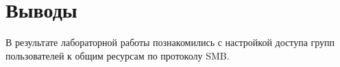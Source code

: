 \section{Выводы}
В результате лабораторной работы познакомились с настройкой доступа групп пользователей к общим ресурсам по протоколу SMB.

